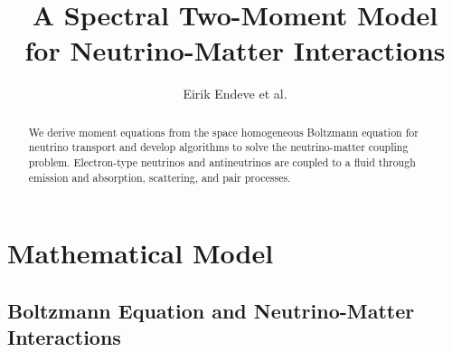 \documentclass[12pt]{article}
\begin{document}
\title{A Spectral Two-Moment Model \\ for Neutrino-Matter Interactions}
\author{Eirik Endeve et al.}

\maketitle

\begin{abstract}
  We derive moment equations from the space homogeneous Boltzmann equation for neutrino transport and develop algorithms to solve the neutrino-matter coupling problem.  
  Electron-type neutrinos and antineutrinos are coupled to a fluid through emission and absorption, scattering, and pair processes.  
\end{abstract}

\tableofcontents

\section{Mathematical Model}

\subsection{Boltzmann Equation and Neutrino-Matter Interactions}
\end{document}
